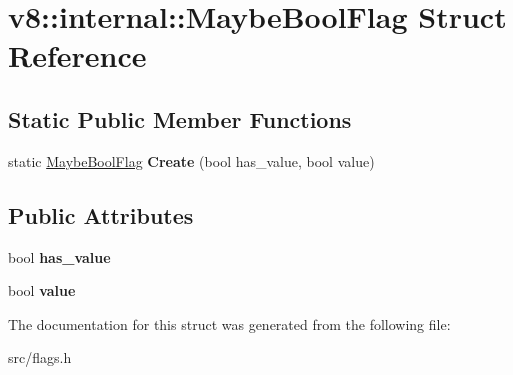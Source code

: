 \hypertarget{structv8_1_1internal_1_1_maybe_bool_flag}{}\section{v8\+:\+:internal\+:\+:Maybe\+Bool\+Flag Struct Reference}
\label{structv8_1_1internal_1_1_maybe_bool_flag}
\subsection*{Static Public Member Functions}
\begin{DoxyCompactItemize}
\item 
\hypertarget{structv8_1_1internal_1_1_maybe_bool_flag_a3068a69456c6d47be63ec08fdb410e2a}{}static \hyperlink{structv8_1_1internal_1_1_maybe_bool_flag}{Maybe\+Bool\+Flag} {\bfseries Create} (bool has\+\_\+value, bool value)\label{structv8_1_1internal_1_1_maybe_bool_flag_a3068a69456c6d47be63ec08fdb410e2a}

\end{DoxyCompactItemize}
\subsection*{Public Attributes}
\begin{DoxyCompactItemize}
\item 
\hypertarget{structv8_1_1internal_1_1_maybe_bool_flag_a0bee5518874f6b96d954aa9788b9725c}{}bool {\bfseries has\+\_\+value}\label{structv8_1_1internal_1_1_maybe_bool_flag_a0bee5518874f6b96d954aa9788b9725c}

\item 
\hypertarget{structv8_1_1internal_1_1_maybe_bool_flag_aa889bcb41b6d384f25fcc181e22d825e}{}bool {\bfseries value}\label{structv8_1_1internal_1_1_maybe_bool_flag_aa889bcb41b6d384f25fcc181e22d825e}

\end{DoxyCompactItemize}


The documentation for this struct was generated from the following file\+:\begin{DoxyCompactItemize}
\item 
src/flags.\+h\end{DoxyCompactItemize}
